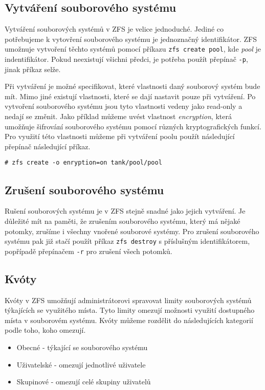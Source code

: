 \subsection{Vytváření souborového systému}
\label{createfs}
Vytváření souborových systémů v ZFS je velice jednoduché. Jediné co potřebujeme k vytovření souborového systému je jednoznačný identifikátor. ZFS umožnuje vytvoření těchto systémů pomocí příkazu \verb|zfs create pool|, kde \emph{pool} je indentifikátor. Pokud neexistují všichni předci, je potřeba použít přepínač \verb|-p|, jinak příkaz selže.

Při vytváření je možné specifikovat, které vlastnosti daný souborový systém bude mít. Mimo jiné existují vlastnosti, které se dají nastavit pouze při vytváření. Po vytvoření souborového systému jsou tyto vlastnosti vedeny jako read-only a nedají se změnit. Jako příklad můžeme uvést vlastnost \emph{encryption}, která umožňuje šifrování souborového systému pomocí různých kryptografických funkcí. Pro využití této vlastnosti můžeme při vytváření poolu použít následující přepínač následující příkaz.
\begin{verbatim}
# zfs create -o enryption=on tank/pool/pool
\end{verbatim}
\subsection{Zrušení souborového systému}
Rušení souborových systému je v ZFS stejně snadné jako jejich vytváření. Je důležité mít na paměti, že zrušením souborového systému, který má nějaké potomky, zrušíme i všechny vnořené souborové systémy. Pro zrušení souborového systému pak již stačí použít příkaz \verb|zfs destroy| s příslušným identifikátorem, popřípadě přepínačem \verb|-r| pro zrušení všech potomků.
\subsection{Kvóty}
\label{quota}

Kvóty v ZFS umožňují administrátorovi spravovat limity souborových systémů týkajících se využitého místa. Tyto limity omezují možnosti využití dostupného místa v souborovém systému. Kvóty můžeme rozdělit do následujících kategorií podle toho, koho omezují.
\begin{itemize}
  \item Obecné - týkající se souborového systému
  \item Uživatelské - omezují jednotlivé uživatele
  \item Skupinové - omezují celé skupiny uživatelů
\end{itemize}

